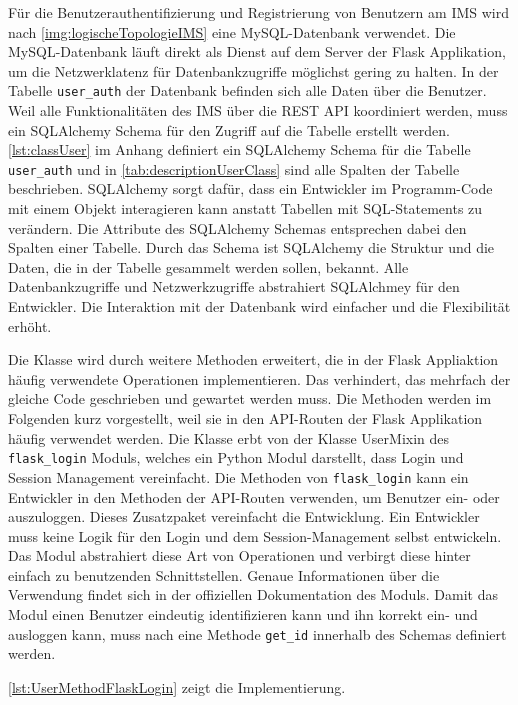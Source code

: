 \documentclass[a4paper,titlepage,halfparskip,12pt]{scrreprt}
\begin{document}
\begin{onehalfspacing}
Für die Benutzerauthentifizierung und Registrierung von Benutzern am \acs{IMS} wird nach \autoref{img:logischeTopologieIMS} eine MySQL-Datenbank verwendet. Die MySQL-Datenbank läuft direkt als Dienst auf dem Server der Flask Applikation, um die Netzwerklatenz für Datenbankzugriffe möglichst gering zu halten. In der Tabelle \texttt{user\_auth} der Datenbank befinden sich alle Daten über die Benutzer. Weil alle Funktionalitäten des \acs{IMS} über die \acs{REST} \acs{API} koordiniert werden, muss ein SQLAlchemy Schema für den Zugriff auf die Tabelle erstellt werden. \autoref{lst:classUser} im Anhang definiert ein SQLAlchemy Schema für die Tabelle \texttt{user\_auth} und in \autoref{tab:descriptionUserClass} sind alle Spalten der Tabelle beschrieben. SQLAlchemy sorgt dafür, dass ein Entwickler im Programm-Code mit einem Objekt interagieren kann anstatt Tabellen mit SQL-Statements zu verändern. Die Attribute des SQLAlchemy Schemas entsprechen dabei den Spalten einer Tabelle. Durch das Schema ist SQLAlchemy die Struktur und die Daten, die in der Tabelle gesammelt werden sollen, bekannt. Alle Datenbankzugriffe und Netzwerkzugriffe abstrahiert SQLAlchmey für den Entwickler. Die Interaktion mit der Datenbank wird einfacher und die Flexibilität erhöht.

Die Klasse wird durch weitere Methoden erweitert, die in der Flask Appliaktion häufig verwendete Operationen implementieren. Das verhindert, das mehrfach der gleiche Code geschrieben und gewartet werden muss. Die Methoden werden im Folgenden kurz vorgestellt, weil sie in den \acs{API}-Routen der Flask Applikation häufig verwendet werden. Die Klasse erbt von der Klasse UserMixin des \texttt{flask\_login} Moduls, welches ein Python Modul darstellt, dass Login und Session Management vereinfacht. Die Methoden von \texttt{flask\_login} kann ein Entwickler in den Methoden der \acs{API}-Routen verwenden, um Benutzer ein- oder auszuloggen. Dieses Zusatzpaket vereinfacht die Entwicklung. Ein Entwickler muss keine Logik für den Login und dem Session-Management selbst entwickeln. Das Modul abstrahiert diese Art von Operationen und verbirgt diese hinter einfach zu benutzenden Schnittstellen. Genaue Informationen über die Verwendung findet sich in der offiziellen Dokumentation \cite{flaskLogin} des Moduls. Damit das Modul einen Benutzer eindeutig identifizieren kann und ihn korrekt ein- und ausloggen kann, muss nach \cite{flaskLogin} eine Methode \texttt{get\_id} innerhalb des Schemas definiert werden.

\autoref{lst:UserMethodFlaskLogin} zeigt die Implementierung.


\end{onehalfspacing}
\end{document}
